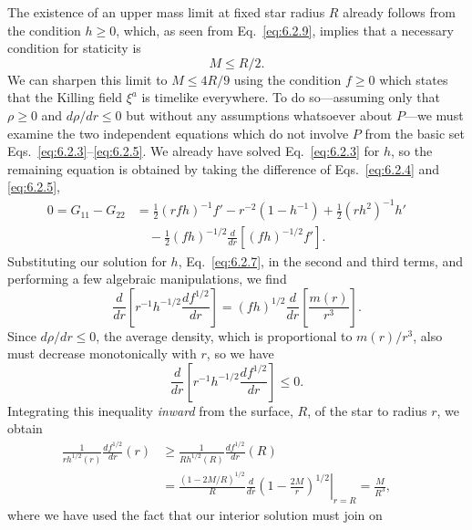 The existence of an upper mass limit at fixed star radius \(R\) already follows
from the condition \(h\geq0\), which, as seen from Eq.~\eqref{eq:6.2.9}, implies
that a necessary condition for staticity is
\begin{equation}
  M\leq R/2.
  \tag{6.2.32}\label{eq:6.2.32}
\end{equation}
We can sharpen this limit to \(M\leq4R/9\) using the condition \(f\geq0\) which
states that the Killing field \(\xi^a\) is timelike everywhere. To do
so---assuming only that \(\rho\geq0\) and \(d\rho/dr\leq0\) but without any
assumptions whatsoever about \(P\)---we must examine the two independent
equations which do not involve \(P\) from the basic set
Eqs.~\eqref{eq:6.2.3}--\eqref{eq:6.2.5}. We already have solved
Eq.~\eqref{eq:6.2.3} for \(h\), so the remaining equation is obtained by taking
the difference of Eqs.~\eqref{eq:6.2.4} and \eqref{eq:6.2.5},
\begin{align}
  0=G_{11}-G_{22}
    &=\frac12(rfh)^{-1}f'-r^{-2}(1-h^{-1})+\frac12(rh^2)^{-1}h'\nonumber\\
    &\quad-\frac12(fh)^{-1/2}\frac{d}{dr}\left[(fh)^{-1/2}f'\right].
  &&\tag{6.2.33}\label{eq:6.2.33}
\end{align}
Substituting our solution for \(h\), Eq.~\eqref{eq:6.2.7}, in the second and
third terms, and performing a few algebraic manipulations, we find
\begin{equation}
  \frac{d}{dr}\left[r^{-1}h^{-1/2}\frac{df^{1/2}}{dr}\right]
  =(fh)^{1/2}\frac{d}{dr}\left[\frac{m(r)}{r^3}\right].
  \tag{6.2.34}\label{eq:6.2.34}
\end{equation}
Since \(d\rho/dr\leq0\), the average density, which is proportional to
\(m(r)/r^3\), also must decrease monotonically with \(r\), so we have
\begin{equation}
  \frac{d}{dr}\left[r^{-1}h^{-1/2}\frac{df^{1/2}}{dr}\right]\leq0.
  \tag{6.2.35}\label{eq:6.2.35}
\end{equation}
Integrating this inequality \emph{inward} from the surface, \(R\), of the star to
radius \(r\), we obtain
\begin{align}
  \frac{1}{rh^{1/2}(r)}\frac{df^{1/2}}{dr}(r)
    &\geq\frac{1}{Rh^{1/2}(R)}\frac{df^{1/2}}{dr}(R)\nonumber\\
    &=\frac{(1-2M/R)^{1/2}}{R}
      \left.\frac{d}{dr}\left(1-\frac{2M}{r}\right)^{1/2}\right|_{r=R}
      =\frac{M}{R^3},
  &&\tag{6.2.36}\label{eq:6.2.36}
\end{align}
where we have used the fact that our interior solution must join on
